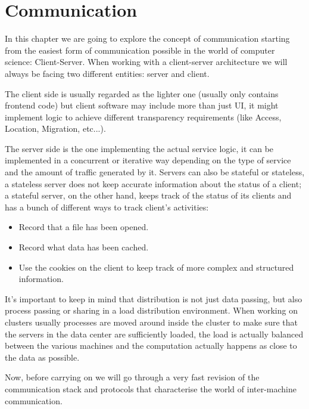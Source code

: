 \chapter{Communication}
In this chapter we are going to explore the concept of communication starting from the easiest form of communication possible in the world of computer science: Client-Server. When working with a client-server architecture we will always be facing two different entities: server and client.

The client side is usually regarded as the lighter one (usually only contains frontend code) but client software may include more than just UI, it might implement logic to achieve different transparency requirements (like Access, Location, Migration, etc...).

The server side is the one implementing the actual service logic, it can be implemented in a concurrent or iterative way depending on the type of service and the amount of traffic generated by it. Servers can also be stateful or stateless, a stateless server does not keep accurate information about the status of a client; a stateful server, on the other hand, keeps track of the status of its clients and has a bunch of different ways to track client's activities:
\begin{itemize}
    \item Record that a file has been opened.
    \item Record what data has been cached.
    \item Use the cookies on the client to keep track of more complex and structured information.
\end{itemize}
It's important to keep in mind that distribution is not just data passing, but also process passing or sharing in a load distribution environment. When working on clusters usually processes are moved around inside the cluster to make sure that the servers in the data center are sufficiently loaded, the load is actually balanced between the various machines and the computation actually happens as close to the data as possible.

Now, before carrying on we will go through a very fast revision of the communication stack and protocols that characterise the world of inter-machine communication.

